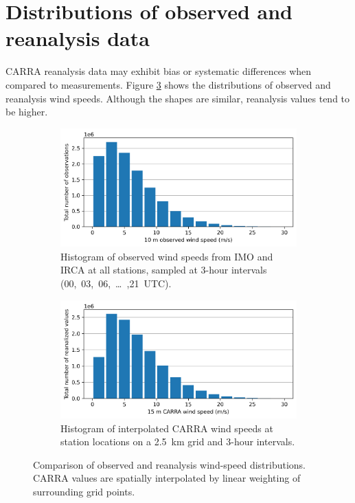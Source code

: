 \section{Distributions of observed and reanalysis data}

CARRA reanalysis data may exhibit bias or systematic differences when compared to measurements. Figure \ref{fig:obs_carra_wind_speeds} shows the distributions of observed and reanalysis wind speeds. Although the shapes are similar, reanalysis values tend to be higher.

\begin{figure}[ht]
  \centering
  \begin{subfigure}[b]{0.8\textwidth}
    \centering
    \includegraphics[width=\textwidth]{Figures/obs_wind_speeds.png}
    \caption{Histogram of observed wind speeds from IMO and IRCA at all stations, sampled at 3-hour intervals (00,~03,~06,~…~,21~UTC).}
    \label{fig:obs_wind_speeds}
  \end{subfigure}
  
  \vspace{0.5cm}
  
  \begin{subfigure}[b]{0.8\textwidth}
    \centering
    \includegraphics[width=\textwidth]{Figures/carra_wind_speeds.png}
    \caption{Histogram of interpolated CARRA wind speeds at station locations on a 2.5~km grid and 3-hour intervals.}
    \label{fig:carra_wind_speeds}
  \end{subfigure}
  
  \caption{Comparison of observed and reanalysis wind-speed distributions. CARRA values are spatially interpolated by linear weighting of surrounding grid points.}
  \label{fig:obs_carra_wind_speeds}
\end{figure}

